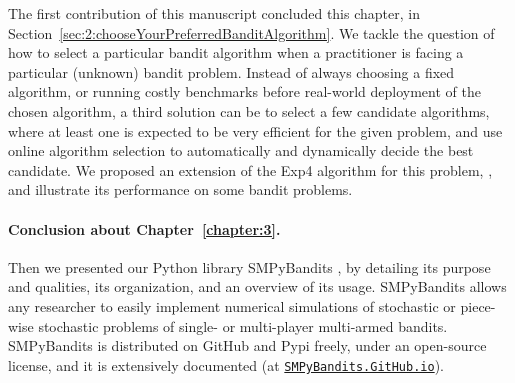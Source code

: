 The first contribution of this manuscript \cite{Besson2018WCNC} concluded this chapter, in Section~\ref{sec:2:chooseYourPreferredBanditAlgorithm}. We tackle the question of how to select a particular bandit algorithm when a practitioner is facing a particular (unknown) bandit problem.
Instead of always choosing a fixed algorithm, or running costly benchmarks before real-world deployment of the chosen algorithm, a third solution can be to select a few candidate algorithms, where at least one is expected to be very efficient for the given problem, and use online algorithm selection to automatically and dynamically decide the best candidate.
We proposed an extension of the Exp4 algorithm for this problem, \Aggr, and illustrate its performance on some bandit problems.


\paragraph{Conclusion about \textbf{Chapter~\ref{chapter:3}}.}

Then we presented our Python library SMPyBandits \cite{SMPyBandits,SMPyBanditsJMLR}, by detailing
its purpose and qualities, its organization, and an overview of its usage.
%
SMPyBandits allows any researcher to easily implement numerical simulations of stochastic or piece-wise stochastic problems of single- or multi-player multi-armed bandits.
SMPyBandits is distributed on GitHub and Pypi freely, under an open-source license, and it is extensively documented (at \href{https://SMPyBandits.GitHub.io}{\texttt{SMPyBandits.GitHub.io}}).

